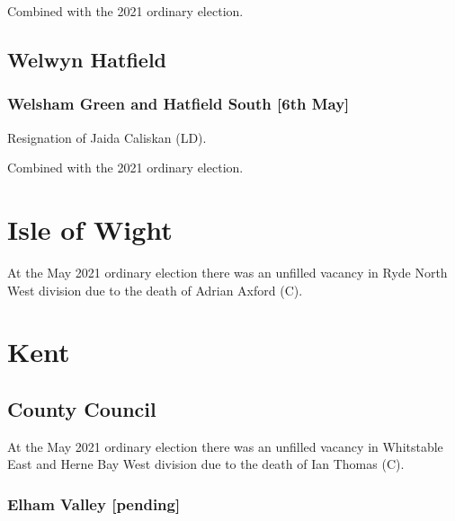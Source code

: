 \documentclass[a4paper,openany]{book}
\begin{document}
\begin{resultsiii}
Combined with the 2021 ordinary election.

\subsection*{Welwyn Hatfield}

\subsubsection*{Welsham Green and Hatfield South \hspace*{\fill}\nolinebreak[1]%
	\enspace\hspace*{\fill}
	[6th May]}


Resignation of Jaida Caliskan (LD).

Combined with the 2021 ordinary election.

\section{Isle of Wight}

At the May 2021 ordinary election there was an unfilled vacancy in Ryde North West division due to the death of Adrian Axford (C).

\section{Kent}

\subsection*{County Council}

At the May 2021 ordinary election there was an unfilled vacancy in Whitstable East and Herne Bay West division due to the death of Ian Thomas (C).

\subsubsection*{Elham Valley \hspace*{\fill}\nolinebreak[1]%
	\enspace\hspace*{\fill}
	[pending]}


\end{resultsiii}
\end{document}
